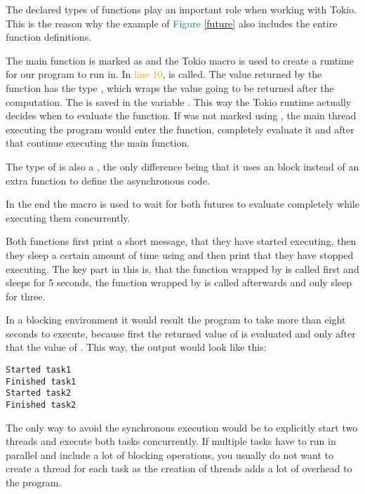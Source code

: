The declared types of functions play an important role when working with Tokio. This is the reason why the example
of \textcolor{teal}{Figure \ref{future}} also includes the entire function definitions.

The main function is marked as  and the Tokio macro is used to create a runtime for our program to run in.
In \textcolor{orange}{line 10},  is called. The value returned by the function has the type
, which wraps the value going to be returned after the computation. The  is
saved in the variable . This way the Tokio runtime actually decides when to evaluate the function. If
 was not marked using , the main thread executing the program would enter the
function, completely evaluate it and after that continue executing the main function.

The type of  is also a , the only difference being that it uses an  block
instead of an extra function to define the asynchronous code.

In the end the macro  is used to wait for both futures to evaluate completely while executing them
concurrently.

Both functions first print a short message, that they have started executing, then they sleep a certain amount of time
using  and then print that they have stopped executing. The key part in this is, that the
function wrapped by  is called first and sleeps for 5 seconds, the function wrapped by  is
called afterwards and only sleep for three.

In a blocking environment it would result the program to take more than eight seconds to execute, because first the
returned value of  is evaluated and only after that the value of . This way, the output
would look like this:

\begin{verbatim}
Started task1
Finished task1
Started task2
Finished task2
\end{verbatim}

The only way to avoid the synchronous execution would be to explicitly start two threads and execute both tasks
concurrently. If multiple tasks have to run in parallel and include a lot of blocking operations, you usually do not
want to create a thread for each task as the creation of threads adds a lot of overhead to the program.

